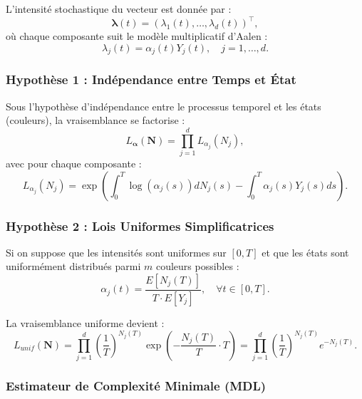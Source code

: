 \documentclass[11pt,a4paper]{article}
\begin{document}
	L'intensité stochastique du vecteur est donnée par :
	\begin{equation}
		\boldsymbol{\lambda}(t) = (\lambda_1(t), \dots, \lambda_d(t))^\top,
	\end{equation}
	où chaque composante suit le modèle multiplicatif d'Aalen :
	\begin{equation}
		\lambda_j(t) = \alpha_j(t)Y_j(t), \quad j = 1, \dots, d.
	\end{equation}
	
	\subsubsection{Hypothèse 1 : Indépendance entre Temps et État}
	
	Sous l'hypothèse d'indépendance entre le processus temporel et les états (couleurs), la vraisemblance se factorise :
	\begin{equation}
		L_{\boldsymbol{\alpha}}(\mathbf{N}) = \prod_{j=1}^d L_{\alpha_j}(N_j),
	\end{equation}
	avec pour chaque composante :
	\begin{equation}
		L_{\alpha_j}(N_j) = \exp \left( \int_0^T \log(\alpha_j(s)) dN_j(s) - \int_0^T \alpha_j(s)Y_j(s) ds \right).
	\end{equation}
	
	\subsubsection{Hypothèse 2 : Lois Uniformes Simplificatrices}
	
	Si on suppose que les intensités sont uniformes sur $[0,T]$ et que les états sont uniformément distribués parmi $m$ couleurs possibles :
	\begin{equation}
		\alpha_j(t) = \frac{E[N_j(T)]}{T \cdot E[Y_j]}, \quad \forall t \in [0,T].
	\end{equation}
	
	La vraisemblance uniforme devient :
	\begin{equation}
		L_{unif}(\mathbf{N}) = \prod_{j=1}^d \left( \frac{1}{T} \right)^{N_j(T)} \exp\left( - \frac{N_j(T)}{T} \cdot T \right) = \prod_{j=1}^d \left( \frac{1}{T} \right)^{N_j(T)} e^{-N_j(T)}.
	\end{equation}
	
	\subsubsection{Estimateur de Complexité Minimale (MDL)}
	
\end{document}
